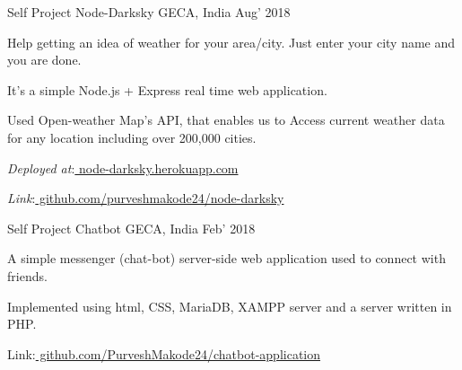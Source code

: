 \begin{cventries}
  \cventry     
    {Self Project} %
    {Node-Darksky} %
    {GECA, India} %
    {Aug’ 2018} %
    {
      \begin{cvitems} %
        \item {Help getting an idea of weather for your area/city. Just enter your city name and you are done.}
        \item {It's a simple Node.js + Express real time web application.}
        \item {Used Open-weather Map's API, that enables us to Access current weather data for any location including over 200,000 cities.}
        \item {{\em Deployed at}:\href{https://node-darksky.herokuapp.com/}{ node-darksky.herokuapp.com}}
        \item {{\em Link}:\href{https://github.com/purveshmakode24/node-darksky}{ github.com/purveshmakode24/node-darksky}}
      \end{cvitems}
    }

 \cventry
 	{Self Project}  
    {Chatbot} %
    {GECA, India} %
    {Feb’ 2018} %
    {
      \begin{cvitems} %
      	\item {A simple messenger (chat-bot) server-side web application used to connect with friends.}
        \item {Implemented using html, CSS, MariaDB, XAMPP server and a server written in PHP.}
        \item {Link:\href{https://github.com/PurveshMakode24/chatbot-application}{ github.com/PurveshMakode24/chatbot-application}} 
      \end{cvitems}
    }
\end{cventries}